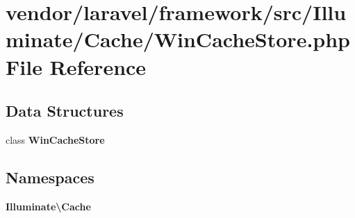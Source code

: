 \section{vendor/laravel/framework/src/\+Illuminate/\+Cache/\+Win\+Cache\+Store.php File Reference}
\label{_win_cache_store_8php}
\subsection*{Data Structures}
\begin{DoxyCompactItemize}
\item 
class {\bf Win\+Cache\+Store}
\end{DoxyCompactItemize}
\subsection*{Namespaces}
\begin{DoxyCompactItemize}
\item 
 {\bf Illuminate\textbackslash{}\+Cache}
\end{DoxyCompactItemize}
